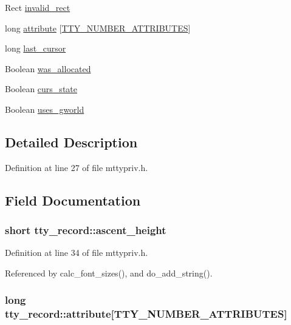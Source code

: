 \begin{DoxyCompactItemize}
Rect \hyperlink{structtty__record_a023de9278dd71dd9872bd6de0f3aed05}{invalid\+\_\+rect}
\item 
long \hyperlink{structtty__record_ae4ea37472a5d6cdcb3d2022780a8d75d}{attribute} \mbox{[}\hyperlink{mactty_8h_ad7212e28d805c885a5acbb8f84d09608ab7905c89135b9fb8e31a0364a6dcb6f0}{T\+T\+Y\+\_\+\+N\+U\+M\+B\+E\+R\+\_\+\+A\+T\+T\+R\+I\+B\+U\+T\+E\+S}\mbox{]}
\item 
long \hyperlink{structtty__record_a405d044b9dbbc32f14664799612233f6}{last\+\_\+cursor}
\item 
Boolean \hyperlink{structtty__record_a3d92b2b933fbf1829bff1560b6888e2f}{was\+\_\+allocated}
\item 
Boolean \hyperlink{structtty__record_acacb69c42d33de982846359bcc476767}{curs\+\_\+state}
\item 
Boolean \hyperlink{structtty__record_ae3a431435a1b84faf10f4b41471ca5fc}{uses\+\_\+gworld}
\end{DoxyCompactItemize}


\subsection{Detailed Description}


Definition at line 27 of file mttypriv.\+h.



\subsection{Field Documentation}
\hypertarget{structtty__record_a079690b95f37c6e5622ec6a8ad94f494}{
\subsubsection[{ascent\+\_\+height}]{\setlength{\rightskip}{0pt plus 5cm}short tty\+\_\+record\+::ascent\+\_\+height}}\label{structtty__record_a079690b95f37c6e5622ec6a8ad94f494}


Definition at line 34 of file mttypriv.\+h.



Referenced by calc\+\_\+font\+\_\+sizes(), and do\+\_\+add\+\_\+string().

\hypertarget{structtty__record_ae4ea37472a5d6cdcb3d2022780a8d75d}{
\subsubsection[{attribute}]{\setlength{\rightskip}{0pt plus 5cm}long tty\+\_\+record\+::attribute\mbox{[}{\bf T\+T\+Y\+\_\+\+N\+U\+M\+B\+E\+R\+\_\+\+A\+T\+T\+R\+I\+B\+U\+T\+E\+S}\mbox{]}}}\label{structtty__record_ae4ea37472a5d6cdcb3d2022780a8d75d}


